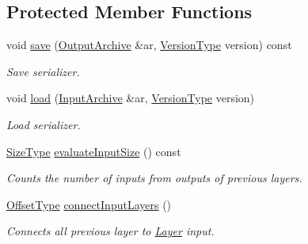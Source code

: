 \subsection*{Protected Member Functions}
\begin{DoxyCompactItemize}
\item 
void \hyperlink{classffnn_1_1layer_1_1_layer_a5091f6ccef4d80254dd8caf72d13d136}{save} (\hyperlink{classffnn_1_1traits_1_1_serializable_a08d986df75d363fa79506d4f6045cb9f}{Output\-Archive} \&ar, \hyperlink{classffnn_1_1traits_1_1_serializable_a08924b3b7d20cb3cb6eafe517d4f7b30}{Version\-Type} version) const 
\begin{DoxyCompactList}\small\item\em Save serializer. \end{DoxyCompactList}\item 
void \hyperlink{classffnn_1_1layer_1_1_layer_a66c56645e54f6e864fb716fdc8858828}{load} (\hyperlink{classffnn_1_1traits_1_1_serializable_a6e626759259f8f370dd4303b4441a234}{Input\-Archive} \&ar, \hyperlink{classffnn_1_1traits_1_1_serializable_a08924b3b7d20cb3cb6eafe517d4f7b30}{Version\-Type} version)
\begin{DoxyCompactList}\small\item\em Load serializer. \end{DoxyCompactList}\item 
\hyperlink{classffnn_1_1layer_1_1internal_1_1_interface_af0567642f60c65b5e87067226a54174b}{Size\-Type} \hyperlink{classffnn_1_1layer_1_1_layer_ad1ca9fa504ca3fc9847d5489dc392ea8}{evaluate\-Input\-Size} () const 
\begin{DoxyCompactList}\small\item\em Counts the number of inputs from outputs of previous layers. \end{DoxyCompactList}\item 
\hyperlink{classffnn_1_1layer_1_1internal_1_1_interface_adc5bb454329ebd51ac26579a43c006fd}{Offset\-Type} \hyperlink{classffnn_1_1layer_1_1_layer_a303d4fc17e59e1cc3081e5a28d6d9417}{connect\-Input\-Layers} ()
\begin{DoxyCompactList}\small\item\em Connects all previous layer to \hyperlink{classffnn_1_1layer_1_1_layer}{Layer} input. \end{DoxyCompactList}\end{DoxyCompactItemize}

